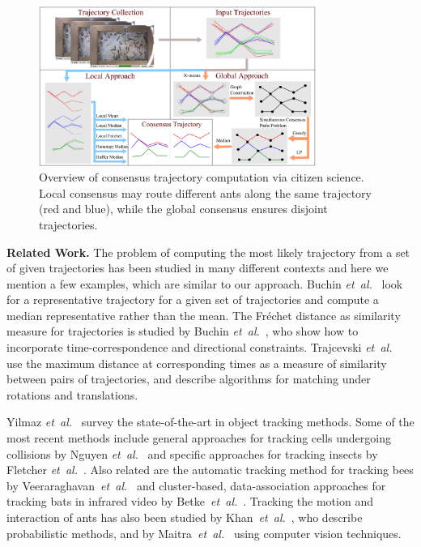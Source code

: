 \documentclass[runningheads]{llncs}
\newcommand{\Frechet}[0]{Fr\'{e}chet}
\begin{document}
\begin{figure}[t]
\centering
\includegraphics[height=5.2cm]{pic/flowchart}
\caption{Overview of consensus trajectory computation via citizen
science. Local consensus may route different ants along  the
same trajectory (red and blue), while the global consensus ensures
disjoint trajectories.}
\label{fig:flow}
\end{figure}

{\bf Related Work.}
The problem of computing the most likely trajectory from a set of given trajectories has been studied in many different contexts and here we mention a few examples, which are similar to our approach.
Buchin {\em et~al.}~\cite{bbklsww-mt-10} look for
a representative trajectory for a given set of trajectories and
compute a median representative rather than the mean.
The \Frechet{} distance as similarity measure for
trajectories is studied by Buchin {\em et~al.}~\cite{DBLP:journals/gis/BuchinBG10}, who show how to
incorporate time-correspondence and directional constraints.
Trajcevski {\em et~al.}~\cite{DBLP:conf/gis/TrajcevskiDSTV07} use the
maximum distance at corresponding times as a measure of similarity between
pairs of trajectories, and describe algorithms for %
matching under rotations and translations.

Yilmaz {\em et~al.}~\cite{Yilmaz:2006:OTS:1177352.1177355} survey
the state-of-the-art in object tracking methods. Some of the most
recent methods include general approaches for tracking
cells undergoing collisions by Nguyen {\em et~al.}~\cite{5779709} and
specific approaches for tracking insects by
Fletcher {\em et~al.}~\cite{5711555}.
Also related are the automatic tracking
method for tracking bees by Veeraraghavan~{\em et~al.}~\cite{10.1109/TPAMI.2007.70707}
and cluster-based, data-association
approaches for tracking bats in infrared video by
Betke~{\em et~al.}~\cite{4270019}. Tracking the motion and interaction
of ants has also been studied by
Khan~{\em et~al.}~\cite{1512059}, who describe probabilistic
methods, and by Maitra~{\em et~al.}~\cite{5403051} using
computer vision techniques.
\end{document}
